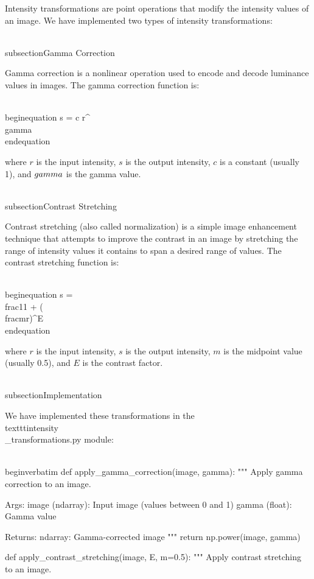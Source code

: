Intensity transformations are point operations that modify the intensity values of an image. We have implemented two types of intensity transformations:

\\subsection{Gamma Correction}

Gamma correction is a nonlinear operation used to encode and decode luminance values in images. The gamma correction function is:

\\begin{equation}
s = c \cdot r^\\gamma
\\end{equation}

where $r$ is the input intensity, $s$ is the output intensity, $c$ is a constant (usually 1), and $\\gamma$ is the gamma value.

\\subsection{Contrast Stretching}

Contrast stretching (also called normalization) is a simple image enhancement technique that attempts to improve the contrast in an image by stretching the range of intensity values it contains to span a desired range of values. The contrast stretching function is:

\\begin{equation}
s = \\frac{1}{1 + (\\frac{m}{r})^E}
\\end{equation}

where $r$ is the input intensity, $s$ is the output intensity, $m$ is the midpoint value (usually 0.5), and $E$ is the contrast factor.

\\subsection{Implementation}

We have implemented these transformations in the \\texttt{intensity\\_transformations.py} module:

\\begin{verbatim}
def apply_gamma_correction(image, gamma):
    """
    Apply gamma correction to an image.
    
    Args:
        image (ndarray): Input image (values between 0 and 1)
        gamma (float): Gamma value
        
    Returns:
        ndarray: Gamma-corrected image
    """
    return np.power(image, gamma)

def apply_contrast_stretching(image, E, m=0.5):
    """
    Apply contrast stretching to an image.
    
